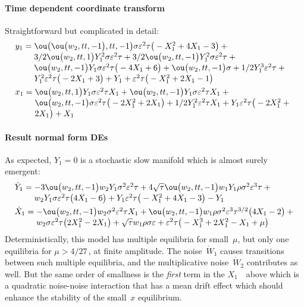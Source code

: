 \paragraph{Time dependent coordinate transform}  Straightforward but complicated in detail:
\begin{align*}&
y_{1}=\ParMath{ \ou\big(\ou\big(w_{2},tt,-1\big),tt,-1\big) \sigma  \eps^{2} \tau 
 \big(-X_{1}^{2}+4 X_{1}-3\big)+3/2 \ou\big(w_{2},tt,1\big) Y_{1}^{2} 
\sigma  \eps^{2} \tau +3/2 \ou\big(w_{2},tt,-1\big) Y_{1}^{2} \sigma  
\eps^{2} \tau +\ou\big(w_{2},tt,-1\big) Y_{1} \sigma  \eps^{2} \tau  
\big(-4 X_{1}+6\big)+\ou\big(w_{2},tt,-1\big) \sigma +1/2 Y_{1}^{3} \eps
^{2} \tau +Y_{1}^{2} \eps^{2} \tau  \big(-2 X_{1}+3\big)+Y_{1}+\eps^{2} 
\tau  \big(-X_{1}^{2}+2 X_{1}-1\big)
}
\\&
x_{1}=\ParMath{ \ou\big(w_{2},tt,1\big) Y_{1} \sigma  \eps^{2} \tau  X_{1}+\ou
\big(w_{2},tt,-1\big) Y_{1} \sigma  \eps^{2} \tau  X_{1}+\ou\big(w_{2},
tt,-1\big) \sigma  \eps^{2} \tau  \big(-2 X_{1}^{2}+2 X_{1}\big)+1/2 Y_{
1}^{2} \eps^{2} \tau  X_{1}+Y_{1} \eps^{2} \tau  \big(-2 X_{1}^{2}+2 X_{
1}\big)+X_{1}
}
\end{align*}

\paragraph{Result normal form DEs}
As expected, \(Y_1=0\) is a stochastic slow manifold which is almost surely emergent:
\begin{align*}&
\dot Y_{1}=\ParMath{ -3 \ou\big(w_{2},tt,-1\big) w_{2} Y_{1} \sigma ^{2} \eps^{2} 
\tau +4 \sqrt {\tau } \ou\big(w_{2},tt,-1\big) w_{1} Y_{1} \rho  \sigma 
^{2} \eps^{3} \tau +w_{2} Y_{1} \sigma  \eps^{2} \tau  \big(4 X_{1}-6
\big)+Y_{1} \eps^{2} \tau  \big(-X_{1}^{2}+4 X_{1}-3\big)-Y_{1}
}
\\&
\dot X_{1}=\ParMath{ -\ou\big(w_{2},tt,-1\big) w_{2} \sigma ^{2} \eps^{2} \tau  X_
{1}+\ou\big(w_{2},tt,-1\big) w_{1} \rho  \sigma ^{2} \eps^{3} \tau^{3/2}  
\big(4 X_{1}-2\big)+w_{2} \sigma  \eps^{2} 
\tau  \big(2 X_{1}^{2}-2 X_{1}\big)+\sqrt {\tau } w_{1} \rho  \sigma  
\eps+\eps^{2} \tau  \big(-X_{1}^{3}+2 X_{1}^{2}-X_{1}+\mu \big)
}
\end{align*}
Deterministically, this model has multiple equilibria for small~$\mu$, but only one equilibria for $\mu>4/27$\,, at finite amplitude.
The noise~$\dot W_1$ causes transitions between such multiple equilibria, and the multiplicative noise~$\dot W_2$ contributes as well.
But the same order of smallness is the \emph{first} term in the $X_1$~\sde\ above which is a quadratic noise-noise interaction that has a mean drift effect which should enhance the stability of the small~$x$ equilibrium.

